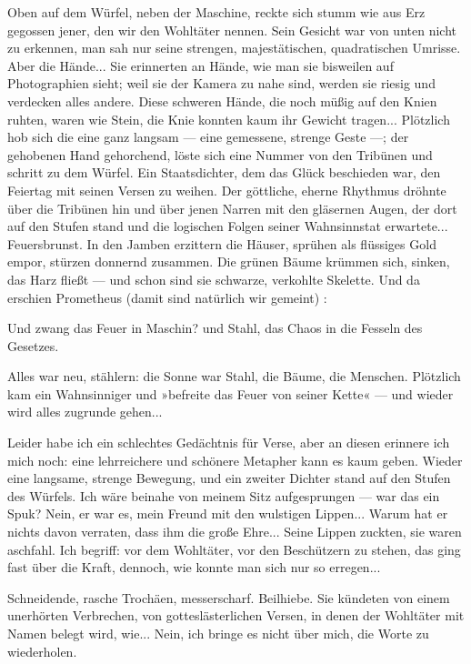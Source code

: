 Oben auf dem Würfel, neben der Maschine, reckte sich stumm wie aus
Erz gegossen jener, den wir den Wohltäter nennen. Sein Gesicht war
von unten nicht zu erkennen, man sah nur seine strengen,
majestätischen, quadratischen Umrisse. Aber die Hände... Sie
erinnerten an Hände, wie man sie bisweilen auf Photographien sieht;
weil sie der Kamera zu nahe sind, werden sie riesig und verdecken
alles andere. Diese schweren Hände, die noch müßig auf den Knien
ruhten, waren wie Stein, die Knie konnten kaum ihr Gewicht
tragen... Plötzlich hob sich die eine ganz langsam — eine
gemessene, strenge Geste —; der gehobenen Hand gehorchend, löste
sich eine Nummer von den Tribünen und schritt zu dem Würfel. Ein
Staatsdichter, dem das Glück beschieden war, den Feiertag mit
seinen Versen zu weihen. Der göttliche, eherne Rhythmus dröhnte
über die Tribünen hin und über jenen Narren mit den gläsernen
Augen, der dort auf den Stufen stand und die logischen Folgen
seiner Wahnsinnstat erwartete... Feuersbrunst. In den Jamben
erzittern die Häuser, sprühen als flüssiges Gold empor, stürzen
donnernd zusammen. Die grünen Bäume krümmen sich, sinken, das Harz
fließt — und schon sind sie schwarze, verkohlte Skelette. Und da
erschien Prometheus (damit sind natürlich wir gemeint) :

Und zwang das Feuer in Maschin? und Stahl, das Chaos in die Fesseln
des Gesetzes.

Alles war neu, stählern: die Sonne war Stahl, die Bäume, die
Menschen. Plötzlich kam ein Wahnsinniger und »befreite das Feuer
von seiner Kette« — und wieder wird alles zugrunde gehen...

Leider habe ich ein schlechtes Gedächtnis für Verse, aber an diesen
erinnere ich mich noch: eine lehrreichere und schönere Metapher
kann es kaum geben. Wieder eine langsame, strenge Bewegung, und ein
zweiter Dichter stand auf den Stufen des Würfels. Ich wäre beinahe
von meinem Sitz aufgesprungen — war das ein Spuk? Nein, er war es,
mein Freund mit den wulstigen Lippen... Warum hat er nichts davon
verraten, dass ihm die große Ehre... Seine Lippen zuckten, sie
waren aschfahl. Ich begriff: vor dem Wohltäter, vor den Beschützern
zu stehen, das ging fast über die Kraft, dennoch, wie konnte man
sich nur so erregen...

Schneidende, rasche Trochäen, messerscharf. Beilhiebe. Sie kündeten
von einem unerhörten Verbrechen, von gotteslästerlichen Versen, in
denen der Wohltäter mit Namen belegt wird, wie... Nein, ich bringe
es nicht über mich, die Worte zu wiederholen.

